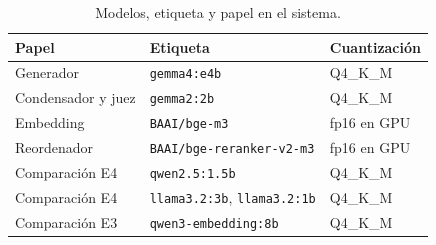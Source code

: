 \documentclass[journal]{IEEEtran}
\begin{document}
\begin{table}[H]
\centering
\footnotesize
\caption{Modelos, etiqueta y papel en el sistema.}
\label{tab:modelos}
\setlength{\tabcolsep}{3pt}
\begin{tabular}{lll}
\toprule
Papel & Etiqueta & Cuantizaci\'on \\
\midrule
Generador & \texttt{gemma4:e4b} & Q4\_K\_M \\
Condensador y juez & \texttt{gemma2:2b} & Q4\_K\_M \\
Embedding & \texttt{BAAI/bge-m3} & fp16 en GPU \\
Reordenador & \texttt{BAAI/bge-reranker-v2-m3} & fp16 en GPU \\
Comparaci\'on E4 & \texttt{qwen2.5:1.5b} & Q4\_K\_M \\
Comparaci\'on E4 & \texttt{llama3.2:3b}, \texttt{llama3.2:1b} & Q4\_K\_M \\
Comparaci\'on E3 & \texttt{qwen3-embedding:8b} & Q4\_K\_M \\
\bottomrule
\end{tabular}
\end{table}
\end{document}
